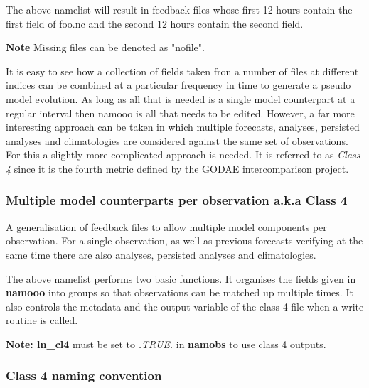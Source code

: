 \documentclass[NEMO_book]{subfiles}
\begin{document}
The above namelist will result in feedback files whose first 12 hours contain
the first field of foo.nc and the second 12 hours contain the second field.

\textbf{Note} Missing files can be denoted as "nofile".

It is easy to see how a collection of fields taken fron a number of files 
at different indices can be combined at a particular frequency in time to 
generate a pseudo model evolution. As long as all that is needed is a single
model counterpart at a regular interval then namooo is all that needs to
be edited. However, a far more interesting approach can be taken in which
multiple forecasts, analyses, persisted analyses and climatologies are
considered against the same set of observations. For this a slightly more
complicated approach is needed. It is referred to as \emph{Class 4} since
it is the fourth metric defined by the GODAE intercomparison project.

\subsubsection{Multiple model counterparts per observation a.k.a Class 4}

A generalisation of feedback files to allow multiple model components per observation. For a single
observation, as well as previous forecasts verifying at the same time there are also analyses, persisted
analyses and climatologies. 


The above namelist performs two basic functions. It organises the fields
given in \textbf{namooo} into groups so that observations can be matched
up multiple times. It also controls the metadata and the output variable
of the class 4 file when a write routine is called.

\textbf{Note: ln\_cl4} must be set to \emph{.TRUE.} in \textbf{namobs} 
to use class 4 outputs.

\subsubsection{Class 4 naming convention}
\end{document}
